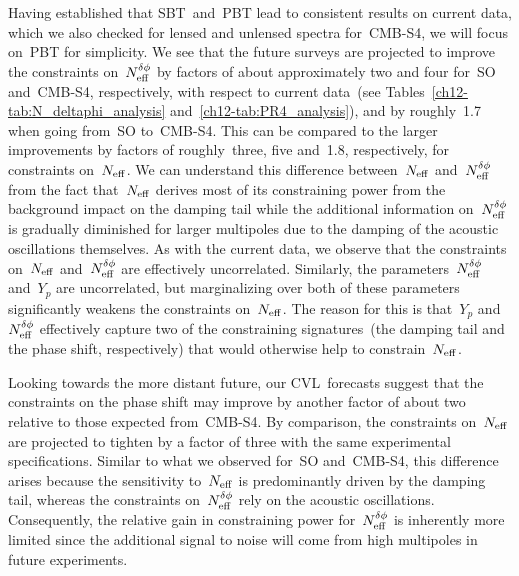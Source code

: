 Having established that SBT~and~PBT lead to consistent results on current data, which we also checked for lensed and unlensed spectra for~\mbox{CMB-S4}, we will focus on~PBT for simplicity. We see that the future surveys are projected to improve the constraints on~$N_\mathrm{eff}^{\delta\phi}$ by factors of about approximately two and four for~SO and~\mbox{CMB-S4}, respectively, with respect to current data~(see Tables~\ref{ch12-tab:N_deltaphi_analysis} and~\ref{ch12-tab:PR4_analysis}), and by roughly~1.7 when going from~SO to~\mbox{CMB-S4}. This can be compared to the larger improvements by factors of roughly~three, five and~1.8, respectively, for constraints on~$N_\mathrm{eff}$. We can understand this difference between~$N_\mathrm{eff}$ and~$N_\mathrm{eff}^{\delta\phi}$ from the fact that~$N_\mathrm{eff}$ derives most of its constraining power from the background impact on the damping tail while the additional information on~$N_\mathrm{eff}^{\delta\phi}$ is gradually diminished for larger multipoles due to the damping of the acoustic oscillations themselves. As with the current data, we observe that the constraints on~$N_\mathrm{eff}$ and~$N_\mathrm{eff}^{\delta\phi}$ are effectively uncorrelated. Similarly, the parameters~$N_\mathrm{eff}^{\delta\phi}$ and~$Y_p$ are uncorrelated, but marginalizing over both of these parameters significantly weakens the constraints on~$N_\mathrm{eff}$. The reason for this is that~$Y_p$ and~$N_\mathrm{eff}^{\delta\phi}$ effectively capture two of the constraining signatures~(the damping tail and the phase shift, respectively) that would otherwise help to constrain~$N_\mathrm{eff}$.

Looking towards the more distant future, our CVL~forecasts suggest that the constraints on the phase shift may improve by another factor of about two relative to those expected from~\mbox{CMB-S4}. By comparison, the constraints on~$N_\mathrm{eff}$ are projected to tighten by a factor of three with the same experimental specifications. Similar to what we observed for~SO and~\mbox{CMB-S4}, this difference arises because the sensitivity to~$N_\mathrm{eff}$ is predominantly driven by the damping tail, whereas the constraints on~$N_\mathrm{eff}^{\delta\phi}$ rely on the acoustic oscillations. Consequently, the relative gain in constraining power for~$N_\mathrm{eff}^{\delta\phi}$ is inherently more limited since the additional signal to noise will come from high multipoles in future experiments.\medskip

